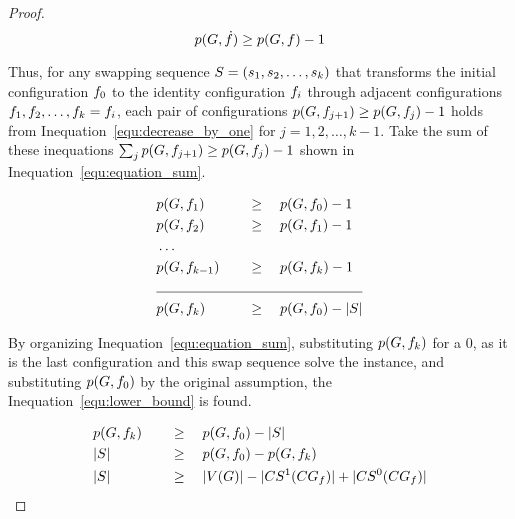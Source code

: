 \documentclass[msc,english,table,xcdraw]{ppgccufmg}
\begin{document}
\begin{proof}
    \begin{equation}
        \centering
        \label{equ:decrease_by_one}
        \applyFunc{p}{\graphG, \sub{\mapFunc}} \geq \applyFunc{p}{\graphG, \mapFunc} - 1
    \end{equation}
    
    Thus, for any swapping sequence $S = (s_1, s_2, \ldots, 
    s_k)$ that transforms the initial configuration $f_{0}$ to the identity
    configuration $f_{i}$ through adjacent configurations $f_{1}, f_2,
    \ldots, f_{k} = f_{i}$, each pair of configurations $p(G, 
    f_{j+1}) \geq p(G, f_{j}) -1$ holds from 
    Inequation~\ref{equ:decrease_by_one} for $j = 1,2,\ldots,k-1$.
    Take the sum of these inequations $\sum_{j} p(G, f_{j+1}) \geq p(G, f_{j}) -1$ shown in Inequation~\ref{equ:equation_sum}.
    
    \begin{alignat}{2}
    \centering
    \label{equ:equation_sum}
    & \applyFunc{p}{\graphG, \mapFunc_{1}}  \quad && \geq \quad \applyFunc{p}{\graphG, \mapFunc_{0}} -1 \nonumber \\
    & \applyFunc{p}{\graphG, \mapFunc_{2}} \quad && \geq \quad \applyFunc{p}{\graphG, \mapFunc_{1}} -1 \nonumber \\
    & \ldots \nonumber \\
    & \applyFunc{p}{\graphG, \mapFunc_{k-1}} \quad && \geq \quad \applyFunc{p}{\graphG, \mapFunc_{k}} -1 \nonumber \\
    \cline{1-4}
    & \applyFunc{p}{\graphG, \mapFunc_{k}} \quad && \geq \quad \applyFunc{p}{\graphG, \mapFunc_{0}} - \sizeof{\swapSeq}
    \end{alignat}
    
    By organizing Inequation~\ref{equ:equation_sum}, substituting $p(G, 
    f_{k})$ for a $0$, as it is the last configuration and this swap sequence solve the
    instance, and substituting $p(G, f_{0})$ by the original assumption,
    the Inequation~\ref{equ:lower_bound} is found.
    
    \begin{alignat}{2}
    \centering
    \label{equ:lower_bound}
    & \applyFunc{p}{\graphG, \mapFunc_{k}} \quad && \geq \quad \applyFunc{p}{\graphG, \mapFunc_{0}} - \sizeof{\swapSeq} \nonumber \\
    & \sizeof{\swapSeq} \quad && \geq \quad \applyFunc{p}{\graphG, \mapFunc_{0}} - \applyFunc{p}{\graphG, \mapFunc_{k}} \nonumber \\
    & \sizeof{\swapSeq} \quad && \geq \quad \sizeof{\vertexFunc{\graphG}} - 
\sizeof{\applyFunc{\oneCycles}{\conflictGraph_{\mapFunc}}} +
\sizeof{\applyFunc{\zeroCycles}{\conflictGraph_{\mapFunc}}}
    \end{alignat}
    
\end{proof}
\end{document}
